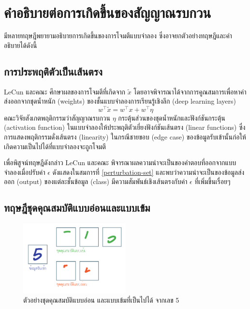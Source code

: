 \documentclass{cpereport}
\begin{document}
\section{คำอธิบายต่อการเกิดขึ้นของสัญญาณรบกวน}

มีหลายทฤษฎีพยายามอธิบายการเกิดขึ้นของการโจมตีแบบจำลอง ซึ่งอาจยกตัวอย่างทฤษฎีและคำอธิบายได้ดังนี้

\subsection{การประพฤติตัวเป็นเส้นตรง}
LeCun และคณะ \cite{1412.6572} ศึกษาผลของการโจมตีที่เกิดจาก $\tilde{x}$ โดยอาจพิจารณาได้จากการคูณสมการเพื่อหาค่าส่งออกจากชุดน้ำหนัก (weights) ของชั้นแบบจำลองการเรียนรู้เชิงลึก (deep learning layers) 
\begin{equation}
    w^\top\tilde{x} = w^\top x + w^\top \eta
\end{equation}
คณะวิจัยสังเกตพฤติกรรมว่าสัญญาณรบกวน $\eta$ กระตุ้นส่วนของชุดน้ำหนักและฟังก์ชันกระตุ้น (activation function) ในแบบจำลองให้ประพฤติตัวเยี่ยงฟังก์ชันเส้นตรง (linear functions) ซึ่งการแสดงพฤติกรรมดั่งเส้นตรง (linearity) ในกรณีชายขอบ (edge case) ของข้อมูลรับเข้านั้นก่อให้เกิดความเป็นไปได้ที่แบบจำลองจะถูกโจมตี

เพื่อพิสูจน์ทฤษฎีดังกล่าว LeCun และคณะ พิจารณาผลความน่าจะเป็นของคำตอบที่ออกจากแบบจำลองเมื่อปรับค่า $\epsilon$ ดังแสดงในสมการที่ \ref{perturbation-set} และพบว่าความน่าจะเป็นของข้อมูลส่งออก (output) ของแต่ละชั้นข้อมูล (class) มีความสัมพันธ์เชิงเส้นตรงกับค่า $\epsilon$ ที่เพิ่มขึ้นเรื่อยๆ

\subsection{ทฤษฎีชุดคุณสมบัติแบบอ่อนและแบบเข้ม}

\begin{figure}
    \centering
    \includegraphics[width=0.5\textwidth]{images/strong-weak-features.pdf}
    \caption{ตัวอย่างชุดคุณสมบัติแบบอ่อน และแบบเข้มที่เป็นไปได้ จากเลข 5}
    \label{5-weak-strong}
\end{figure}
\end{document}
